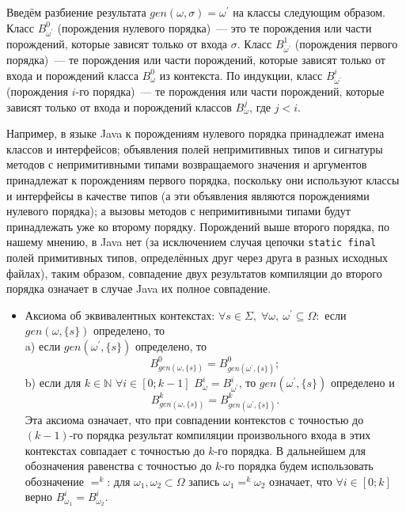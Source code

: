 Введём разбиение результата $gen(\omega, \sigma) = \omega^\prime$ на классы следующим образом. Класс $B^0_{\omega^\prime}$ (порождения нулевого порядка)~--- это те порождения или части порождений, которые зависят только от входа $\sigma$. Класс $B^1_{\omega^\prime}$ (порождения первого порядка)~--- те порождения или части порождений, которые зависят только от входа и порождений класса $B^0_{\omega}$ из контекста. По индукции, класс $B^i_{\omega^\prime}$ (порождения $i$-го порядка)~--- те порождения или части порождений, которые зависят только от входа и порождений классов $B^j_{\omega}$, где $j < i$.

Например, в языке Java к порождениям нулевого порядка принадлежат имена классов и интерфейсов; объявления полей непримитивных типов и сигнатуры методов с непримитивными типами возвращаемого значения и аргументов принадлежат к порождениям первого порядка, поскольку они используют классы и интерфейсы в качестве типов (а эти объявления являются порождениями нулевого порядка); а вызовы методов с непримитивными типами будут принадлежать уже ко второму порядку. Порождений выше второго порядка, по нашему мнению, в Java нет (за исключением случая цепочки \texttt{static final} полей примитивных типов, определённых друг через друга в разных исходных файлах), таким образом, совпадение двух результатов компиляции до второго порядка означает в случае Java их полное совпадение. 

\begin{itemize}	
	\item Аксиома об эквивалентных контекстах: $\forall s \in \Sigma,\; \forall \omega,\: \omega^\prime \subseteq \Omega:$ если $gen(\omega, \{s\})$ определено, то\\
	a) если $gen(\omega^\prime, \{s\})$ определено, то $$B^0_{gen(\omega, \{s\})} = B^0_{gen(\omega^\prime, \{s\})};$$
	b) если для $k \in \mathbb{N}$ $\forall i \in [0; k-1]$ $B^i_{\omega} = B^i_{\omega^\prime}$, то $gen(\omega^\prime, \{s\})$ определено и $$B^k_{gen(\omega, \{s\})} = B^k_{gen(\omega^\prime, \{s\})}.$$
	Эта аксиома означает, что при совпадении контекстов с точностью до $(k-1)$-го порядка результат компиляции произвольного входа в этих контекстах совпадает с точностью до $k$-го порядка. В дальнейшем для обозначения равенства с точностью до $k$-го порядка будем использовать обозначение $=^k$: для $\omega_1, \omega_2 \subset \Omega$ запись $\omega_1 =^k \omega_2$ означает, что $\forall i \in [0; k]$ верно $B^i_{\omega_1} = B^i_{\omega_2}$.
\end{itemize}

